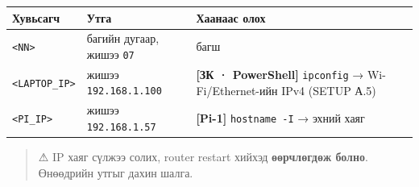 \begingroup\scriptsize\begin{longtable}[]{@{}lll@{}}
\toprule
\begin{minipage}[b]{0.30\columnwidth}\raggedright
Хувьсагч\strut
\end{minipage} & \begin{minipage}[b]{0.30\columnwidth}\raggedright
Утга\strut
\end{minipage} & \begin{minipage}[b]{0.30\columnwidth}\raggedright
Хаанаас олох\strut
\end{minipage}\tabularnewline
\midrule
\endhead
\begin{minipage}[t]{0.30\columnwidth}\raggedright
\texttt{\textless{}NN\textgreater{}}\strut
\end{minipage} & \begin{minipage}[t]{0.30\columnwidth}\raggedright
багийн дугаар, жишээ \texttt{07}\strut
\end{minipage} & \begin{minipage}[t]{0.30\columnwidth}\raggedright
багш\strut
\end{minipage}\tabularnewline
\begin{minipage}[t]{0.30\columnwidth}\raggedright
\texttt{\textless{}LAPTOP\_\allowbreak{}IP\textgreater{}}\strut
\end{minipage} & \begin{minipage}[t]{0.30\columnwidth}\raggedright
жишээ \texttt{192.168.1.100}\strut
\end{minipage} & \begin{minipage}[t]{0.30\columnwidth}\raggedright
\textbf{{[}ЗК · PowerShell{]}} \texttt{ipconfig} → Wi-Fi/Ethernet-ийн IPv4 (SETUP А.5)\strut
\end{minipage}\tabularnewline
\begin{minipage}[t]{0.30\columnwidth}\raggedright
\texttt{\textless{}PI\_\allowbreak{}IP\textgreater{}}\strut
\end{minipage} & \begin{minipage}[t]{0.30\columnwidth}\raggedright
жишээ \texttt{192.168.1.57}\strut
\end{minipage} & \begin{minipage}[t]{0.30\columnwidth}\raggedright
\textbf{{[}Pi-1{]}} \texttt{hostname\ -I} → эхний хаяг\strut
\end{minipage}\tabularnewline
\bottomrule
\end{longtable}\endgroup

\begin{quote}
⚠ IP хаяг сүлжээ солих, router restart хийхэд \textbf{өөрчлөгдөж болно}. Өнөөдрийн утгыг дахин шалга.
\end{quote}

